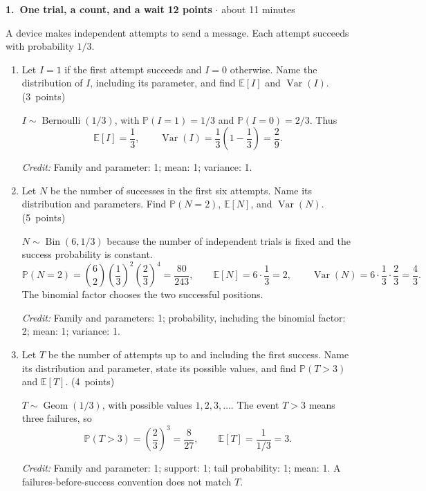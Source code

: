 \documentclass[11pt,letterpaper]{article}
\newcommand{\Prob}{\mathbb P}
\newcommand{\E}{\mathbb E}
\DeclareMathOperator{\Var}{Var}
\newcommand{\partpts}[1]{\unskip\nobreak\hspace{.3em}%
  \mbox{\small\color{muted}(#1 points)}}
\newcommand{\credit}[1]{\par{\footnotesize\color{muted}\textit{Credit:} #1}}
\newcommand{\problem}[4]{\par\addvspace{8pt}%
  {\large\bfseries\color{indigo}#1.\ #2}\hfill
  {\small\color{muted}\textbf{#3 points} $\cdot$ about #4 minutes}\par\nobreak}
\begin{document}
\problem{1}{One trial, a count, and a wait}{12}{11}
A device makes independent attempts to send a message. Each attempt
succeeds with probability $1/3$.
\begin{enumerate}
  \item Let $I=1$ if the first attempt succeeds and $I=0$ otherwise.
  Name the distribution of $I$, including its parameter, and find
  $\E[I]$ and $\Var(I)$. \partpts{3}
  \begin{solution}[1.1in]
    $I\sim\operatorname{Bernoulli}(1/3)$, with
    $\Prob(I=1)=1/3$ and $\Prob(I=0)=2/3$. Thus
    \[
      \E[I]=\frac13,\qquad
      \Var(I)=\frac13\left(1-\frac13\right)=\frac29.
    \]
    \credit{Family and parameter: 1; mean: 1; variance: 1.}
  \end{solution}

  \item Let $N$ be the number of successes in the first six attempts.
  Name its distribution and parameters. Find $\Prob(N=2)$,
  $\E[N]$, and $\Var(N)$. \partpts{5}
  \begin{solution}[1.8in]
    $N\sim\operatorname{Bin}(6,1/3)$ because the number of independent
    trials is fixed and the success probability is constant.
    \[
      \Prob(N=2)=\binom62\left(\frac13\right)^2
                         \left(\frac23\right)^4=\frac{80}{243},
      \qquad
      \E[N]=6\cdot\frac13=2,
      \qquad \Var(N)=6\cdot\frac13\cdot\frac23=\frac43.
    \]
    The binomial factor chooses the two successful positions.
    \credit{Family and parameters: 1; probability, including the
    binomial factor: 2; mean: 1; variance: 1.}
  \end{solution}

  \item Let $T$ be the number of attempts up to and including the first
  success. Name its distribution and parameter, state its possible values,
  and find $\Prob(T>3)$ and $\E[T]$. \partpts{4}
  \begin{solution}[1.65in]
    $T\sim\operatorname{Geom}(1/3)$, with possible values $1,2,3,\ldots$.
    The event $T>3$ means three failures, so
    \[
      \Prob(T>3)=\left(\frac23\right)^3=\frac8{27},
      \qquad \E[T]=\frac1{1/3}=3.
    \]
    \credit{Family and parameter: 1; support: 1; tail probability: 1;
    mean: 1. A failures-before-success convention does not match $T$.}
  \end{solution}
\end{enumerate}
\end{document}
